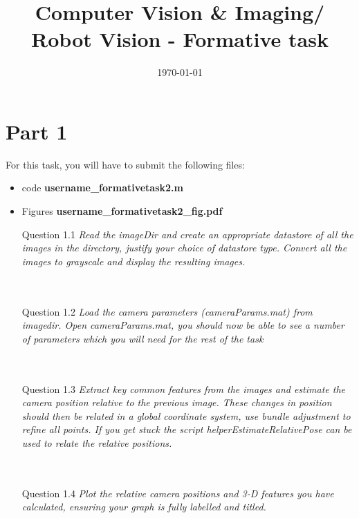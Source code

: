 \documentclass[a4paper, oneside]{article}
\newcommand\nd{\textsuperscript{nd}\xspace}
\newcommand{\assignment}[0]{assignment\xspace}
\begin{document}
	\title{Computer Vision \& Imaging/ Robot Vision - Formative task}
	\date{\today}
	
	\maketitle


	\section*{Part 1}
	For this task, you will have to submit the following files:
    \begin{itemize}
    \item code \textbf{username\_formativetask2.m}
    \item Figures \textbf{username\_formativetask2_fig.pdf}
    
    \item[Question 1.1] \emph{Read the imageDir and create an appropriate datastore of all the images in the directory, justify your choice of datastore type. Convert all the images to grayscale and display the resulting images.}
    \\
    \\
    \\
	\item[Question 1.2] \emph{Load the camera parameters (cameraParams.mat) from imagedir. Open cameraParams.mat, you should now be able to see a number of parameters which you will need for the rest of the task}
\\
\\
\\
	\item[Question 1.3] \emph{Extract key common features from the images and estimate the camera position relative to the previous image. These changes in position should then be related in a global coordinate system, use bundle adjustment to refine all points. If you get stuck the script helperEstimateRelativePose can be used to relate the relative positions.}
	\\
	\\
	\\
	\item[Question 1.4] \emph{Plot the relative camera positions and 3-D features you have calculated, ensuring your graph is fully labelled and titled.}
    \end{itemize}
\end{document}
